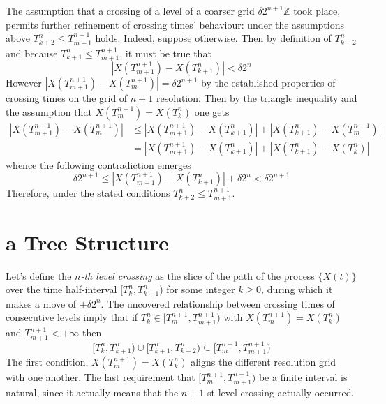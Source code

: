 The assumption that a crossing of a level of a coarser grid $\delta 2^{n+1} \mathbb{Z}$
took place, permits further refinement of crossing times' behaviour: under the assumptions
above $T_{k+2}^n\leq T_{m+1}^{n+1}$ holds. Indeed, suppose otherwise. Then by definition
of $T_{k+2}^n$ and because $T_{k+1}^n \leq T_{m+1}^{n+1}$, it must be true that
\[ |X(T_{m+1}^{n+1}) - X(T_{k+1}^n)| < \delta 2^n \]
However $|X(T_{m+1}^{n+1}) - X(T_m^{n+1})| = \delta 2^{n+1}$ by the established
properties of crossing times on the grid of $n+1$ resolution. Then by the triangle
inequality and the assumption that $X(T_m^{n+1}) = X(T_k^n)$ one gets
\begin{align*}
    |X(T_{m+1}^{n+1}) - X(T_m^{n+1})| 
    & \leq |X(T_{m+1}^{n+1}) - X(T_{k+1}^n)| + |X(T_{k+1}^n) - X(T_m^{n+1})| \\
    & = |X(T_{m+1}^{n+1}) - X(T_{k+1}^n)| + |X(T_{k+1}^n) - X(T_k^n)|
\end{align*}
whence the following contradiction emerges
\[
\delta 2^{n+1}
\leq |X(T_{m+1}^{n+1}) - X(T_{k+1}^n)| + \delta 2^n
< \delta 2^{n+1}
\]
Therefore, under the stated conditions $T_{k+2}^n\leq T_{m+1}^{n+1}$.


\section{a Tree Structure} %
\label{sec:a_tree_structure}

Let's define the \emph{$n$-th level crossing} as the slice of the path of the process
$\{X(t)\}$ over the time half-interval $[T_k^n,T_{k+1}^n)$ for some integer $k\geq 0$,
during which it makes a move of $\pm \delta 2^n$. The uncovered relationship between
crossing times of consecutive levels imply that if $T_k^n \in [T_m^{n+1}, T_{m+1}^{n+1})$
with $X(T_m^{n+1}) = X(T_k^n)$ and $T_{m+1}^{n+1} < +\infty$ then
\[
\bigl[T_k^n,T_{k+1}^n\bigr) \cup \bigl[T_{k+1}^n,T_{k+2}^n\bigr)
\subseteq \bigl[T_m^{n+1},T_{m+1}^{n+1}\bigr)
\]
The first condition, $X(T_m^{n+1}) = X(T_k^n)$ aligns the different resolution grid
with one another. The last requirement that $[T_m^{n+1}, T_{m+1}^{n+1})$ be a finite
interval is natural, since it actually means that the $n+1$-st level crossing actually
occurred.

